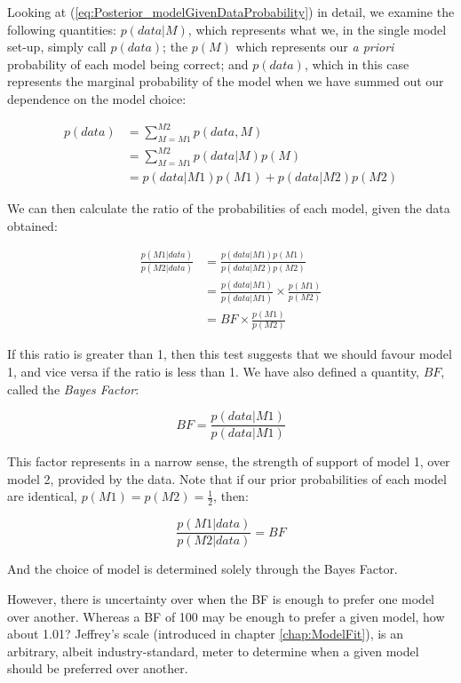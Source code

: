 \documentclass[11pt,fullpage]{book}
\begin{document}
Looking at (\ref{eq:Posterior_modelGivenDataProbability}) in detail, we examine the following quantities: $p(data|M)$, which represents what we, in the single model set-up, simply call $p(data)$; the $p(M)$ which represents our \textit{a priori} probability of each model being correct; and $p(data)$, which in this case represents the marginal probability of the model when we have summed out our dependence on the model choice:


\begin{align}
p(data) &= \sum\limits_{M=M1}^{M2} p(data,M)\\
&= \sum\limits_{M=M1}^{M2} p(data|M) p(M)\\
&= p(data|M1) p(M1) + p(data|M2) p(M2)
\end{align}

We can then calculate the ratio of the probabilities of each model, given the data obtained:

\begin{align}\label{eq:Posterior_modelComparisonFull}
\frac{p(M1|data)}{p(M2|data)} &= \frac{p(data|M1) p(M1)}{p(data|M2) p(M2)}\\
&= \frac{p(data|M1)}{p(data|M1)} \times \frac{p(M1)}{p(M2)}\\
&= BF \times \frac{p(M1)}{p(M2)}
\end{align}

If this ratio is greater than 1, then this test suggests that we should favour model 1, and vice versa if the ratio is less than 1. We have also defined a quantity, $BF$, called the \textit{Bayes Factor}:

\begin{equation}\label{eq:Posterior_bayesFactorDefinition}
BF = \frac{p(data|M1)}{p(data|M1)}
\end{equation}

This factor represents in a narrow sense, the strength of support of model 1, over model 2, provided by the data. Note that if our prior probabilities of each model are identical, $p(M1) = p(M2) = \frac{1}{2}$, then:

\begin{equation}
\frac{p(M1|data)}{p(M2|data)} = BF
\end{equation}

And the choice of model is determined solely through the Bayes Factor. 

However, there is uncertainty over when the BF is enough to prefer one model over another. Whereas a BF of 100 may be enough to prefer a given model, how about 1.01? Jeffrey's scale (introduced in chapter \ref{chap:ModelFit}), is an arbitrary, albeit industry-standard, meter to determine when a given model should be preferred over another.
\end{document}
